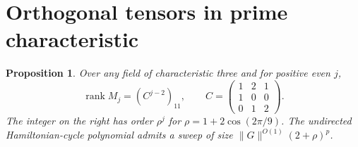 \documentclass[11pt]{article}
\newtheorem{proposition}[theorem]{Proposition}
\theoremstyle{definition}
\newcommand{\rank}{\operatorname{rank}}
\begin{document}
\section{Orthogonal tensors in prime characteristic}\label{sec:modular}

\begin{proposition}\label{prop:mod3}
Over any field of characteristic three and for positive even \(j\),
\[
 \rank M_j=(C^{j-2})_{11},\qquad
 C=\begin{pmatrix}1&2&1\\1&0&0\\0&1&2\end{pmatrix}.
\]
The integer on the right has order \(\rho^j\) for \(\rho=1+2\cos(2\pi/9)\). The undirected Hamiltonian-cycle polynomial admits a sweep of size \(\|G\|^{O(1)}(2+\rho)^p\).
\end{proposition}
\end{document}
